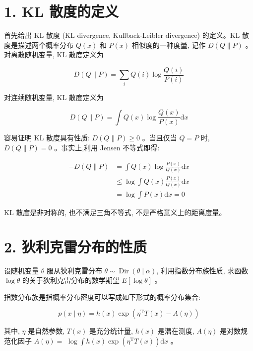 \documentclass[10pt]{article}
\begin{document}
\section*{1. KL 散度的定义}
首先给出 KL 散度 (KL divergence, Kullback-Leibler divergence) 的定义。KL 散度是描述两个概率分布 $Q(x)$ 和 $P(x)$ 相似度的一种度量, 记作 $D(Q \| P)$ 。对离散随机变量, KL 散度定义为


\begin{equation*}
D(Q \| P)=\sum_{i} Q(i) \log \frac{Q(i)}{P(i)} \tag{E.1}
\end{equation*}


对连续随机变量, KL 散度定义为


\begin{equation*}
D(Q \| P)=\int Q(x) \log \frac{Q(x)}{P(x)} \mathrm{d} x \tag{E.2}
\end{equation*}


容易证明 KL 散度具有性质: $D(Q \| P) \geqslant 0$ 。当且仅当 $Q=P$ 时, $D(Q \| P)=0$ 。事实上,利用 Jensen 不等式即得:


\begin{align*}
-D(Q \| P) & =\int Q(x) \log \frac{P(x)}{Q(x)} \mathrm{d} x \\
& \leqslant \log \int Q(x) \frac{P(x)}{Q(x)} \mathrm{d} x \\
& =\log \int P(x) \mathrm{d} x=0 \tag{E.3}
\end{align*}


KL 散度是非对称的, 也不满足三角不等式, 不是严格意义上的距离度量。

\section*{2. 狄利克雷分布的性质}
设随机变量 $\theta$ 服从狄利克雷分布 $\theta \sim \operatorname{Dir}(\theta \mid \alpha)$, 利用指数分布族性质, 求函数 $\log \theta$ 的关于狄利克雷分布的数学期望 $E[\log \theta]$ 。

指数分布族是指概率分布密度可以写成如下形式的概率分布集合:


\begin{equation*}
p(x \mid \eta)=h(x) \exp \left(\eta^{\mathrm{T}} T(x)-A(\eta)\right) \tag{E.4}
\end{equation*}


其中, $\eta$ 是自然参数, $T(x)$ 是充分统计量, $h(x)$ 是潜在测度, $A(\eta)$ 是对数规范化因子 $A(\eta)=$ $\log \int h(x) \exp \left(\eta^{\mathrm{T}} T(x)\right) \mathrm{d} x$ 。
\end{document}
